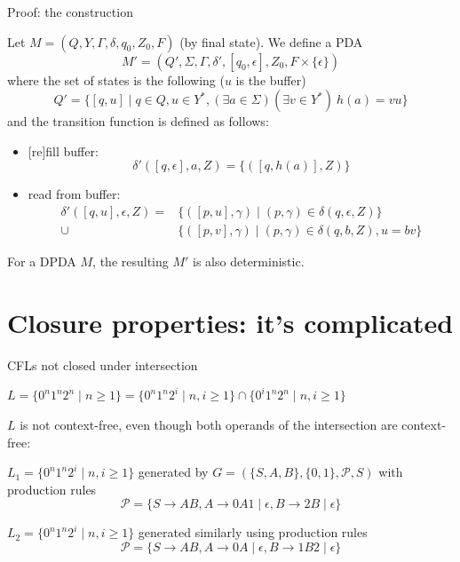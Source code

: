 \documentclass[handout]{beamer}
\begin{document}
\begin{frame}{Proof: the construction}    
    
    Let $M=(Q,Y,\Gamma, \delta, q_0,Z_0,F)$ (by final state).
    We define a PDA  
    $$M'=(Q',\Sigma,\Gamma,\delta',\left[q_0,\epsilon\right], Z_0,F\times\{\epsilon\})$$ 
    where the set of states is the following ($u$ is the buffer)
    $$
    Q'=\{\left[q,u\right]\mid q\in Q, u\in Y^*, (\exists a\in \Sigma) (\exists v\in Y^*)\ h(a)=vu\}
    $$
    and the transition function is defined as follows:
    \begin{itemize}
        \item \alert{{[re]}fill buffer:} 
        \vspace{-6pt}
        $$
        \delta'(\left[q,\epsilon\right],a,Z)=\{(\left[q,h(a)\right],Z)\}
        $$
        \item \alert{read from buffer:}
        \begin{align*}
            \delta'(\left[q,u\right],\epsilon,Z)=&\{(\left[p,u\right],\gamma)\mid (p,\gamma)\in \delta(q,\epsilon,Z)\}\\
            \mathbin{\cup}&\{(\left[p,v\right],\gamma)\mid (p,\gamma)\in \delta(q,b,Z), u=bv\}
        \end{align*}
    \end{itemize}
 
    
    \medskip
    
    For a DPDA $M$, the resulting $M'$ is also deterministic.
    \hfill\qedsymbol

\end{frame}


\section*{Closure properties: it's complicated}


\begin{frame}{CFLs not closed under intersection}

    \begin{example}
        $L=\{0^n1^n2^n \mid n\geq 1\}=\{0^n1^n2^i \mid n,i\geq 1\}\cap \{0^i1^n2^n \mid n,i\geq 1\}$
    \end{example}

    $L$ is not context-free, even though both operands of the intersection are context-free:
 
    $L_1=\{0^n1^n2^i\mid n,i\geq 1\}$ generated by $G=(\{S,A,B\},\{0,1\},\mathcal P,S)$ with production rules 
    $$
    \mathcal P=\{S\rightarrow AB, A\rightarrow 0A1\mid\epsilon, B\rightarrow 2B\mid\epsilon \}
    $$
        
    $L_2=\{0^n1^n2^i \mid n,i\geq 1\}$ generated similarly using production rules 
    $$
    \mathcal P=\{S\rightarrow AB, A\rightarrow 0A\mid\epsilon, B\rightarrow 1B2\mid\epsilon \}
    $$

\end{frame}
\end{document}

